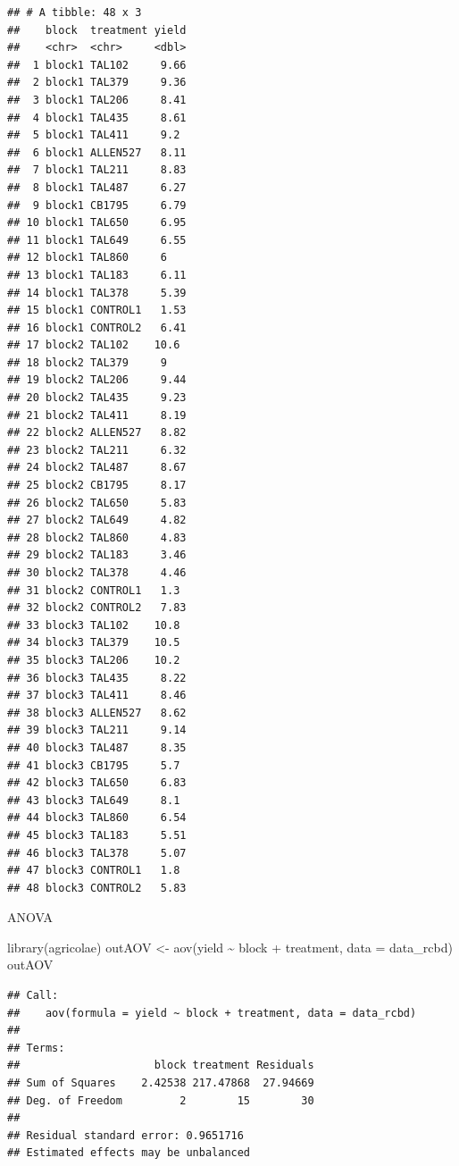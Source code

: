 \documentclass[
]{book}
\newenvironment{Shaded}{\begin{snugshade}}{\end{snugshade}}
\newcommand{\AttributeTok}[1]{\textcolor[rgb]{0.77,0.63,0.00}{#1}}
\newcommand{\FunctionTok}[1]{\textcolor[rgb]{0.00,0.00,0.00}{#1}}
\newcommand{\NormalTok}[1]{#1}
\newcommand{\OtherTok}[1]{\textcolor[rgb]{0.56,0.35,0.01}{#1}}
\newcommand{\SpecialCharTok}[1]{\textcolor[rgb]{0.00,0.00,0.00}{#1}}
\begin{document}
\begin{verbatim}
## # A tibble: 48 x 3
##    block  treatment yield
##    <chr>  <chr>     <dbl>
##  1 block1 TAL102     9.66
##  2 block1 TAL379     9.36
##  3 block1 TAL206     8.41
##  4 block1 TAL435     8.61
##  5 block1 TAL411     9.2 
##  6 block1 ALLEN527   8.11
##  7 block1 TAL211     8.83
##  8 block1 TAL487     6.27
##  9 block1 CB1795     6.79
## 10 block1 TAL650     6.95
## 11 block1 TAL649     6.55
## 12 block1 TAL860     6   
## 13 block1 TAL183     6.11
## 14 block1 TAL378     5.39
## 15 block1 CONTROL1   1.53
## 16 block1 CONTROL2   6.41
## 17 block2 TAL102    10.6 
## 18 block2 TAL379     9   
## 19 block2 TAL206     9.44
## 20 block2 TAL435     9.23
## 21 block2 TAL411     8.19
## 22 block2 ALLEN527   8.82
## 23 block2 TAL211     6.32
## 24 block2 TAL487     8.67
## 25 block2 CB1795     8.17
## 26 block2 TAL650     5.83
## 27 block2 TAL649     4.82
## 28 block2 TAL860     4.83
## 29 block2 TAL183     3.46
## 30 block2 TAL378     4.46
## 31 block2 CONTROL1   1.3 
## 32 block2 CONTROL2   7.83
## 33 block3 TAL102    10.8 
## 34 block3 TAL379    10.5 
## 35 block3 TAL206    10.2 
## 36 block3 TAL435     8.22
## 37 block3 TAL411     8.46
## 38 block3 ALLEN527   8.62
## 39 block3 TAL211     9.14
## 40 block3 TAL487     8.35
## 41 block3 CB1795     5.7 
## 42 block3 TAL650     6.83
## 43 block3 TAL649     8.1 
## 44 block3 TAL860     6.54
## 45 block3 TAL183     5.51
## 46 block3 TAL378     5.07
## 47 block3 CONTROL1   1.8 
## 48 block3 CONTROL2   5.83
\end{verbatim}

ANOVA

\begin{Shaded}
\begin{Highlighting}[]
\FunctionTok{library}\NormalTok{(agricolae)}
\NormalTok{outAOV }\OtherTok{\textless{}{-}} \FunctionTok{aov}\NormalTok{(yield }\SpecialCharTok{\textasciitilde{}}\NormalTok{ block }\SpecialCharTok{+}\NormalTok{ treatment, }\AttributeTok{data =}\NormalTok{ data\_rcbd)}
\NormalTok{outAOV}
\end{Highlighting}
\end{Shaded}

\begin{verbatim}
## Call:
##    aov(formula = yield ~ block + treatment, data = data_rcbd)
## 
## Terms:
##                     block treatment Residuals
## Sum of Squares    2.42538 217.47868  27.94669
## Deg. of Freedom         2        15        30
## 
## Residual standard error: 0.9651716
## Estimated effects may be unbalanced
\end{verbatim}
\end{document}
